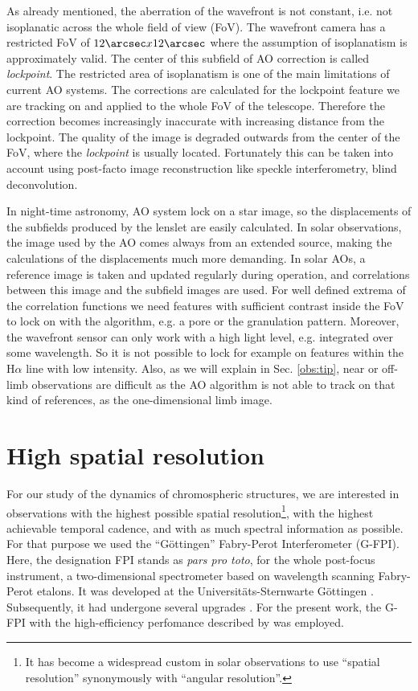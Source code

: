 As already mentioned, the aberration of the wavefront is not constant, i.e. not isoplanatic across the whole field of view (FoV). The wavefront camera has a restricted FoV of $12\arcsec x12\arcsec$ where the assumption of isoplanatism is approximately valid. The center of this subfield of AO correction is called \emph{lockpoint}. The restricted area of isoplanatism is one of the main limitations of current AO systems. The corrections are calculated for the lockpoint feature we are tracking on and applied to the whole FoV of the telescope. Therefore the correction becomes increasingly inaccurate with increasing distance from the lockpoint. The quality of the image is degraded outwards from the center of the FoV, where the \emph{lockpoint} is usually located.  Fortunately this can be taken into account using post-facto image reconstruction like speckle interferometry, blind deconvolution.

In night-time astronomy, AO system lock on a star image, so the displacements of the subfields produced by the lenslet are easily calculated. In solar observations, the image used by the AO comes always from an extended source, making the calculations of the displacements much more demanding. In solar AOs, a reference image is taken and updated regularly during operation, and correlations between this image and the subfield images are used. For well defined extrema of the correlation functions we need features with sufficient contrast inside the FoV to lock on with the algorithm, e.g. a pore or the granulation pattern. Moreover, the wavefront sensor can only work with a high light level, e.g. integrated over some wavelength. So it is not possible to lock for example on  features within the H$\alpha$ line with low intensity. Also, as we will explain in Sec. \ref{obs:tip}, near or off-limb observations are difficult as the AO algorithm is not able to track on that kind of references, as the one-dimensional limb image.




\section{High spatial resolution}
For our study of the dynamics of chromospheric structures, we are interested in observations with the highest possible spatial resolution\footnote{It has become a widespread custom in solar observations  to use  ``spatial resolution'' synonymously  with ``angular resolution''.}, with the highest achievable temporal cadence, and with as much spectral information as possible. For that purpose we used the ``G\"ottingen'' Fabry-Perot Interferometer (G-FPI). Here, the designation FPI stands as \emph{pars pro toto}, for the whole post-focus instrument, a two-dimensional spectrometer based on wavelength scanning Fabry-Perot etalons. It was developed at the Universit\"ats-Sternwarte G\"ottingen \citep{1992A&A...257..817B,1993PhDT.......243B,1995A&AS..112..371B}. Subsequently, it had undergone several upgrades \citep[][submitted]{2001A&A...365..588K, 2006A&A...451.1151P,Gonzalez:2007fk}. For the present work, the G-FPI with the high-efficiency perfomance described by \cite{2006A&A...451.1151P} was employed.

